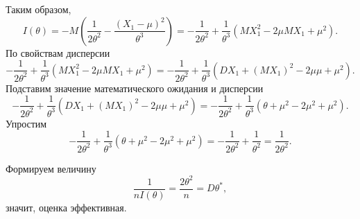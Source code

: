 Таким образом,
$$I \left( \theta \right) =
  -M \left( \frac{1}{2 \theta^2} - \frac{ \left( X_1 - \mu \right)^2}{ \theta^3} \right) =
  - \frac{1}{2 \theta^2} + \frac{1}{ \theta^3} \left( MX_1^2 - 2 \mu MX_1 + \mu^2 \right).$$
По свойствам дисперсии
$$- \frac{1}{2 \theta^2} + \frac{1}{ \theta^3} \left( MX_1^2 - 2 \mu MX_1 + \mu^2 \right) =
  - \frac{1}{2 \theta^2} +
  \frac{1}{ \theta^3} \left( DX_1 + \left( MX_1 \right)^2 - 2 \mu \mu + \mu^2 \right).$$
Подставим значение математического ожидания и дисперсии
$$- \frac{1}{2 \theta^2} +
  \frac{1}{ \theta^3} \left( DX_1 + \left( MX_1 \right)^2 - 2 \mu \mu + \mu^2 \right) =
  - \frac{1}{2 \theta^2} + \frac{1}{ \theta^3} \left( \theta + \mu^2 - 2 \mu^2 + \mu^2 \right).$$
Упростим
$$- \frac{1}{2 \theta^2} + \frac{1}{ \theta^3} \left( \theta + \mu^2 - 2 \mu^2 + \mu^2 \right) =
  - \frac{1}{2 \theta^2} + \frac{1}{ \theta^2} =
  \frac{1}{2 \theta^2}.$$

Формируем величину
$$ \frac{1}{nI \left( \theta \right) } =
  \frac{2 \theta^2}{n} =
  D \theta^*,$$
значит, оценка эффективная.
